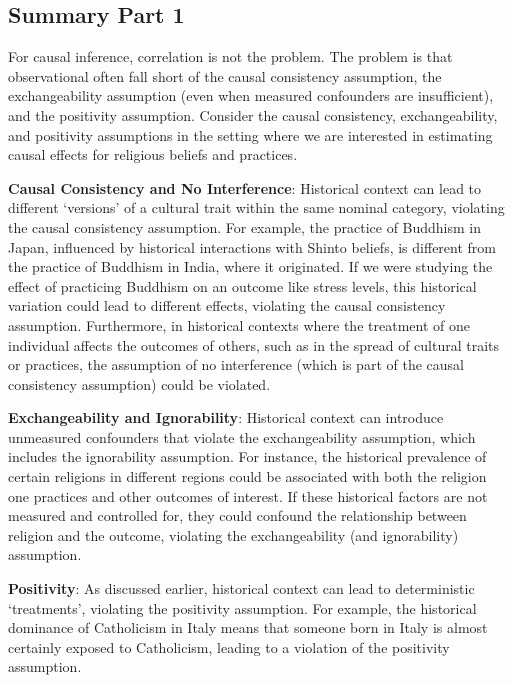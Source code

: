 \documentclass[
  singlecolumn]{report}
\begin{document}
\hypertarget{summary-part-1}{%
\subsection{Summary Part 1}\label{summary-part-1}}

For causal inference, correlation is not the problem. The problem is
that observational often fall short of the causal consistency
assumption, the exchangeability assumption (even when measured
confounders are insufficient), and the positivity assumption. Consider
the causal consistency, exchangeability, and positivity assumptions in
the setting where we are interested in estimating causal effects for
religious beliefs and practices.

\textbf{Causal Consistency and No Interference}: Historical context can
lead to different `versions' of a cultural trait within the same nominal
category, violating the causal consistency assumption. For example, the
practice of Buddhism in Japan, influenced by historical interactions
with Shinto beliefs, is different from the practice of Buddhism in
India, where it originated. If we were studying the effect of practicing
Buddhism on an outcome like stress levels, this historical variation
could lead to different effects, violating the causal consistency
assumption. Furthermore, in historical contexts where the treatment of
one individual affects the outcomes of others, such as in the spread of
cultural traits or practices, the assumption of no interference (which
is part of the causal consistency assumption) could be violated.

\textbf{Exchangeability and Ignorability}: Historical context can
introduce unmeasured confounders that violate the exchangeability
assumption, which includes the ignorability assumption. For instance,
the historical prevalence of certain religions in different regions
could be associated with both the religion one practices and other
outcomes of interest. If these historical factors are not measured and
controlled for, they could confound the relationship between religion
and the outcome, violating the exchangeability (and ignorability)
assumption.

\textbf{Positivity}: As discussed earlier, historical context can lead
to deterministic `treatments', violating the positivity assumption. For
example, the historical dominance of Catholicism in Italy means that
someone born in Italy is almost certainly exposed to Catholicism,
leading to a violation of the positivity assumption.
\end{document}
